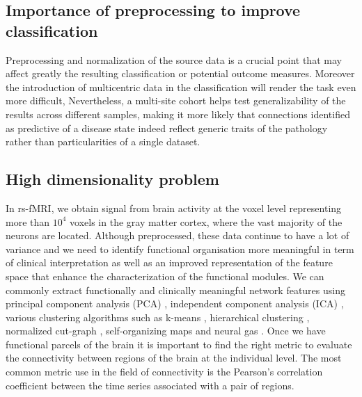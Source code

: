 \subsection{Importance of preprocessing to improve classification}
Preprocessing and normalization of the source data is a crucial point that may affect greatly the resulting classification or potential outcome measures. Moreover the introduction of multicentric data in the classification will render the task even more difficult, Nevertheless, a multi-site cohort helps test generalizability of the results across different samples, making it more likely that connections identified as predictive of a disease state indeed reflect generic traits of the pathology rather than particularities of a single dataset.

\subsection{High dimensionality problem}
In rs-fMRI, we obtain signal from brain activity at the voxel level representing more than $10^4$ voxels in the gray matter cortex, where the vast majority of the neurons are located. Although preprocessed, these data continue to have a lot of variance and we need to identify functional organisation more meaningful in term of clinical interpretation as well as an improved representation of the feature space that enhance the characterization of the functional modules. We can commonly extract functionally and clinically meaningful network features using principal component analysis (PCA) \citep{Zhong2009}, independent component analysis (ICA) \citep{McKeown1998}, various clustering algorithms such as k-means \citep{Baumgartner1998}, hierarchical clustering \citep{Cordes2002}, normalized cut-graph \citep{Heuvel2008}, self-organizing maps and neural gas \citep{Meyer-Baese2004}. Once we have functional parcels 
of the brain it is important to find the right metric to evaluate the connectivity between regions of the brain at the individual level. The most common metric use in the field of connectivity is the Pearson's correlation coefficient between the time series associated with a pair of regions.

